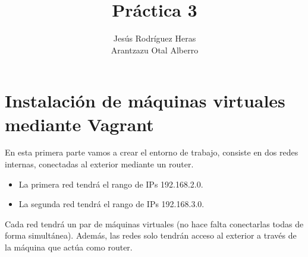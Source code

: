 \documentclass[12pt,letterpaper]{article}
\title{Práctica 3}
\author{Jesús Rodríguez Heras\\
	Arantzazu Otal Alberro}
\begin{document}
	
	\maketitle
%			
	\thispagestyle{empty}
	\newpage
	
	
	
	
	
	\lstset{language=bash, numbers=left, numberstyle=\tiny, numbersep=10pt, firstnumber=1, stepnumber=1, basicstyle=\small\ttfamily, tabsize=1, extendedchars=true, inputencoding=utf8/latin1, breaklines=true}
	
\section{Instalación de máquinas virtuales mediante Vagrant}
En esta primera parte vamos a crear el entorno de trabajo, consiste en dos redes internas, conectadas al exterior mediante un router.
\begin{itemize}
	\item La primera red tendrá el rango de IPs 192.168.2.0.
	\item La segunda red tendrá el rango de IPs 192.168.3.0.
\end{itemize}

Cada red tendrá un par de máquinas virtuales (no hace falta conectarlas todas de forma simultánea). Además, las redes solo tendrán acceso al exterior a través de la máquina que actúa como router.
\end{document}

